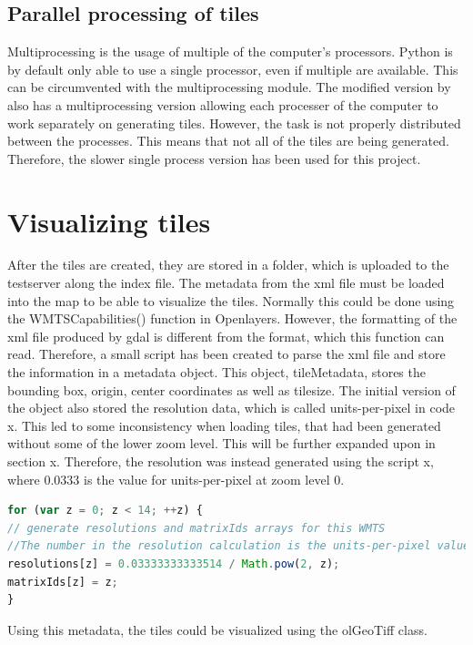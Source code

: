 \subsection{Parallel processing of tiles}
Multiprocessing is the usage of multiple of the computer’s processors. Python is by default only able to use a single processor, even if multiple are available.  This can be circumvented with the multiprocessing module.
\citep{Multiprocessing}
The modified version by \citet{gdalLeaflet} also has a multiprocessing version allowing each processer of the computer to work separately on generating tiles. However, the task is not properly distributed between the processes. This means that not all of the tiles are being generated. 
\citep{NoMulti}
Therefore, the slower single process version has been used for this project.


\section{Visualizing tiles}
After the tiles are created, they are stored in a folder, which is uploaded to the testserver along the index file. 
The metadata from the xml file must be loaded into the map to be able to visualize the tiles. Normally this could be done using the WMTSCapabilities() function in Openlayers.
\citep{WmtsOl}
However, the formatting of the xml file produced by gdal is different from the format, which this function can read. Therefore, a small script has been created to parse the xml file and store the information in a metadata object. This object, tileMetadata, stores the bounding box, origin, center coordinates as well as tilesize. The initial version of the object also stored the resolution data, which is called units-per-pixel in code x. This led to some inconsistency when loading tiles, that had been generated without some of the lower zoom level. This will be further expanded upon in section x. Therefore, the resolution was instead generated using the script x, where 0.0333 is the value for units-per-pixel at zoom level 0. 

\begin{lstlisting}[language=JavaScript, caption={The JavaScript in the project}, label= VoresJS,escapechar=|]
for (var z = 0; z < 14; ++z) {
// generate resolutions and matrixIds arrays for this WMTS
//The number in the resolution calculation is the units-per-pixel value at zoomlayer 0 in the xml file generated by gdal2tiles
resolutions[z] = 0.03333333333514 / Math.pow(2, z);
matrixIds[z] = z;
}
\end{lstlisting}
Using this metadata, the tiles could be visualized using the olGeoTiff class. 

